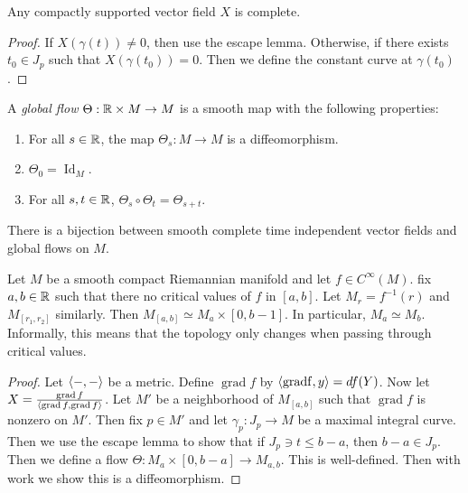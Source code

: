 \documentclass[twoside, 10pt]{article}
\begin{document}
    \begin{prop} Any compactly supported vector field $X$ is complete.
    \end{prop}

    \begin{proof} If $X(\gamma(t)) \neq 0$, then use the escape lemma.
    Otherwise, if there exists $t_0 \in J_p$ such that $X(\gamma(t_0)) = 0$.
Then we define the constant curve at $\gamma(t_0)$.  \end{proof}

    \begin{defn} A \textit{global flow} $\Theta:\mathbb{R} \times M \to M$ is a smooth
        map with the following properties: \begin{enumerate} \item For all $s
            \in \mathbb{R}$, the map $\Theta_s:M \to M$ is a diffeomorphism.  \item
            $\Theta_0 = \operatorname{Id}_M$.  \item For all $s, t \in \mathbb{R}$,
    $\Theta_s \circ \Theta_t = \Theta_{s+t}$.  \end{enumerate} \end{defn}

    \begin{thm} There is a bijection between smooth complete time independent
    vector fields and global flows on $M$.  \end{thm}

    \begin{exm} Let $M$ be a smooth compact Riemannian manifold and let $f \in
        C^{\infty}(M)$. fix $a,b \in \mathbb{R}$ such that there no critical values of
        $f$ in $[a,b]$. Let $M_r = f^{-1}(r)$ and $M_{[r_1, r_2]}$ similarly.
        Then $M_{[a,b]} \simeq M_a \times [0, b-1]$. In particular, $M_a \simeq
        M_b$. Informally, this means that the topology only changes when
        passing through critical values.  \end{exm}

    \begin{proof} Let $\langle-,-\rangle$ be a metric. Define $\operatorname{grad} f$
        by $\langle\operatorname{grad f}, y\rangle = df(Y)$. Now let $X =
        \frac{\operatorname{grad} f}{\langle\operatorname{grad} f,
        \operatorname{grad} f\rangle}$. Let $M'$ be a neighborhood of $M_{[a,b]}$
        such that $\operatorname{grad} f$ is nonzero on $M'$. Then fix $p \in
        M'$ and let $\gamma_p: J_p \to M$ be a maximal integral curve. Then we
        use the escape lemma to show that if $J_p \ni t \leq b-a$, then $b-a
        \in J_p$. Then we define a flow $\Theta:M_a \times [0, b-a] \to
        M_{a,b}$. This is well-defined. Then with work we show this is a
        diffeomorphism.  \end{proof}
\end{document}
